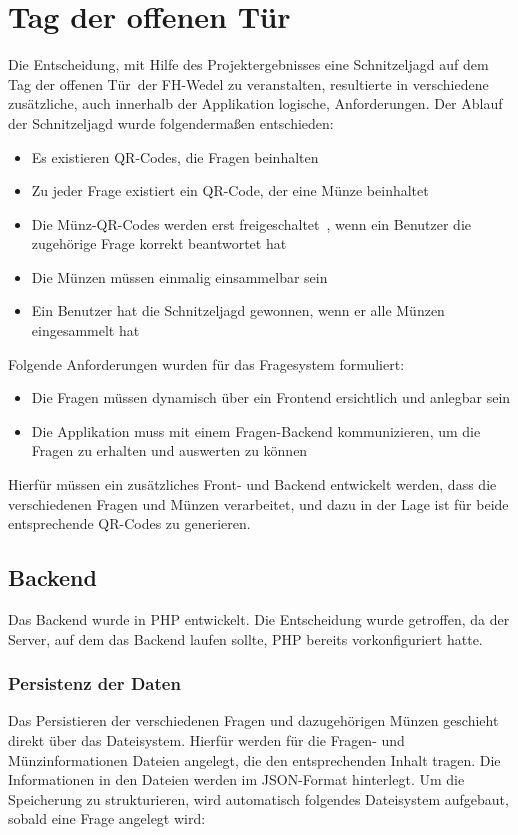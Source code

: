 \chapter{Tag der offenen Tür}

Die Entscheidung, mit Hilfe des Projektergebnisses eine Schnitzeljagd auf dem \glqq Tag der offenen Tür\grqq\ der FH-Wedel zu veranstalten, resultierte in verschiedene zusätzliche, auch innerhalb der Applikation logische, Anforderungen.
Der Ablauf der Schnitzeljagd wurde folgendermaßen entschieden:

\begin{itemize}
\item Es existieren QR-Codes, die Fragen beinhalten
\item Zu jeder Frage existiert ein QR-Code, der eine Münze beinhaltet
\item Die Münz-QR-Codes werden erst \glqq freigeschaltet\grqq\ , wenn ein Benutzer die zugehörige Frage korrekt beantwortet hat
\item Die Münzen müssen einmalig einsammelbar sein
\item Ein Benutzer hat die Schnitzeljagd gewonnen, wenn er alle Münzen eingesammelt hat
\end{itemize}
Folgende Anforderungen wurden für das Fragesystem formuliert:

\begin{itemize}
\item Die Fragen müssen dynamisch über ein Frontend ersichtlich und anlegbar sein
\item Die Applikation muss mit einem Fragen-Backend kommunizieren, um die Fragen zu erhalten und auswerten zu können
\end{itemize}

Hierfür müssen ein zusätzliches Front- und Backend entwickelt werden, dass die verschiedenen Fragen und Münzen verarbeitet, und dazu in der Lage ist für beide entsprechende QR-Codes zu generieren.

\section{Backend}
Das Backend wurde in PHP entwickelt. Die Entscheidung wurde getroffen, da der Server, auf dem das Backend laufen sollte, PHP bereits vorkonfiguriert hatte.

\subsection{Persistenz der Daten}
\label{sub:Persistenz}
Das Persistieren der verschiedenen Fragen und dazugehörigen Münzen geschieht direkt über das Dateisystem. Hierfür werden für die Fragen- und Münzinformationen Dateien angelegt, die den entsprechenden Inhalt tragen. Die Informationen in den Dateien werden im JSON-Format hinterlegt.
Um die Speicherung zu strukturieren, wird automatisch folgendes Dateisystem aufgebaut, sobald eine Frage angelegt wird:

